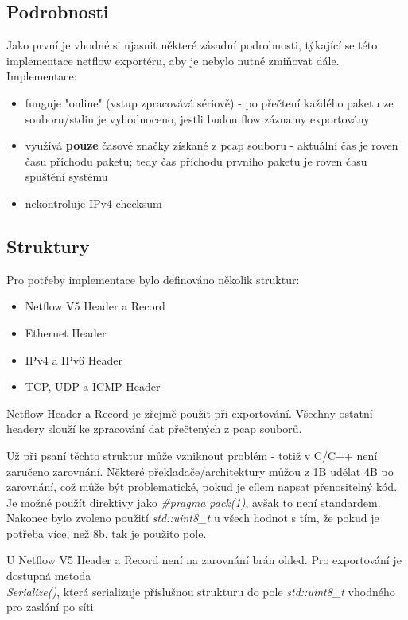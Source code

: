 \documentclass{article}
\begin{document}
\subsection{Podrobnosti}
Jako první je vhodné si ujasnit některé zásadní podrobnosti,
týkající se této implementace netflow exportéru, aby je nebylo nutné
zmiňovat dále. Implementace:
\begin{itemize}
    \item funguje "online" (vstup zpracovává sériově)
    - po přečtení každého paketu ze souboru/stdin je vyhodnoceno,
    jestli budou flow záznamy exportovány
    \item využívá \textbf{pouze} časové značky získané z pcap souboru
    - aktuální čas je roven času příchodu paketu;
    tedy čas příchodu prvního paketu je roven času spuštění systému
    \item nekontroluje IPv4 checksum
\end{itemize}

\subsection{Struktury}
Pro potřeby implementace bylo definováno několik struktur:
\begin{itemize}
    \item Netflow V5 Header a Record
    \item Ethernet Header
    \item IPv4 a IPv6 Header
    \item TCP, UDP a ICMP Header
\end{itemize}

Netflow Header a Record je zřejmě použit při exportování.
Všechny ostatní headery slouží ke zpracování dat přečtených z pcap souborů.

Už při psaní těchto struktur může vzniknout problém
- totiž v C/C++ není zaručeno zarovnání.
Některé překladače/architektury můžou z 1B udělat 4B po zarovnání,
což může být problematické, pokud je cílem napsat přenositelný kód.
Je možné použít direktivy jako \textit{\#pragma pack(1)}, avšak to není standardem.
Nakonec bylo zvoleno použití \textit{std::uint8\_t} u všech hodnot s tím,
že pokud je potřeba více, než 8b, tak je použito pole.

U Netflow V5 Header a Record není na zarovnání brán ohled.
Pro exportování je dostupná metoda \\ \textit{Serialize()},
která serializuje příslušnou strukturu do pole \textit{std::uint8\_t}
vhodného pro zaslání po síti.
\end{document}
